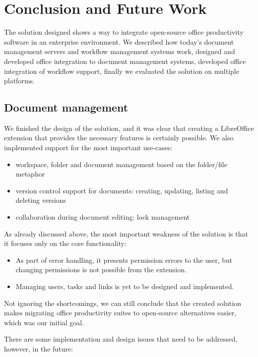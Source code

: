 \chapter{Conclusion and Future Work}
\label{chap:conclusion}

The solution designed shows a way to integrate open-source office productivity
software in an enterprise environment. We described how today's document
management servers and workflow management systems work, designed and
developed office integration to document management systems, developed
office integration of workflow support, finally we evaluated the solution on
multiple platforms.

\section{Document management}

We finished the design of the solution, and it was clear that creating a
LibreOffice extension that provides the necessary features is certainly
possible. We also implemented support for the most important use-cases:

\begin{itemize}
\item workspace, folder and document management based on the folder/file metaphor
\item version control support for documents: creating, updating, listing and deleting versions
\item collaboration during document editing: lock management
\end{itemize}

As already discussed above, the most important weakness of the solution is that
it focuses only on the core functionality:

\begin{itemize}
\item As part of error handling, it presents permission errors to the user, but
changing permissions is not possible from the extension.
\item Managing users, tasks and links is yet to be designed and implemented.
\end{itemize}

Not ignoring the shortcomings, we can still conclude that the created solution
makes migrating office productivity suites to open-source alternatives easier,
which was our initial goal.

There are some implementation and design issues that need to be addressed,
however, in the future:

